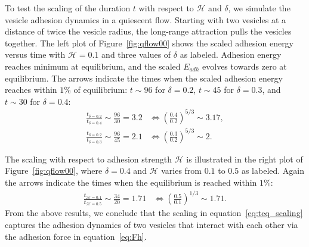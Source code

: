 \documentclass[prf,superscriptaddress,showpacs]{revtex4-1}
\begin{document}
To test the scaling of the duration $t$ with respect to $\mathcal{H}$
and $\delta$, we simulate the vesicle adhesion dynamics in a quiescent
flow.  Starting with two vesicles at a distance of twice the vesicle
radius, the long-range attraction pulls the vesicles together.  The left
plot of Figure~\ref{fig:qflow00} shows the scaled adhesion energy versus
time with $\mathcal{H}=0.1$ and three values of $\delta$ as labeled.
Adhesion energy reaches minimum at equilibrium, and the scaled $E_{adh}$
evolves towards zero at equilibrium.  The arrows indicate the times when
the scaled adhesion energy reaches within $1\%$ of equilibrium: $t\sim
96$ for $\delta=0.2$, $t\sim 45$ for $\delta = 0.3$, and $t\sim 30$ for
$\delta=0.4$:
\begin{align*}
\frac{t_{\delta=0.2}}{t_{\delta=0.4}} \sim \frac{96}{30}=3.2 
  &\Longleftrightarrow \left(\frac{0.4}{0.2}\right)^{5/3}\sim 3.17,\\
\frac{t_{\delta=0.2}}{t_{\delta=0.3}} \sim \frac{96}{45}=2.1 
  &\Longleftrightarrow \left(\frac{0.3}{0.2}\right)^{5/3}\sim 2.
\end{align*}

The scaling with respect to adhesion strength $\mathcal{H}$ is
illustrated in the right plot of Figure~\ref{fig:qflow00}, where $\delta
= 0.4$ and $\mathcal{H}$ varies from $0.1$ to $0.5$ as labeled.  Again
the arrows indicate the times when the equilibrium is reached within
$1\%$:
\begin{align*}
  \frac{t_{\mathcal{H}=0.1}}{t_{\mathcal{H}=0.5}} \sim \frac{34}{20} = 1.71 
  &\Longleftrightarrow \left(\frac{0.5}{0.1}\right)^{1/3}\sim 1.71.
\end{align*}
From the above results, we conclude that the scaling in
equation~\eqref{eq:teq_scaling} captures the adhesion dynamics of two
vesicles that interact with each other via the adhesion force in
equation~\eqref{eq:Fh}.

\end{document}
